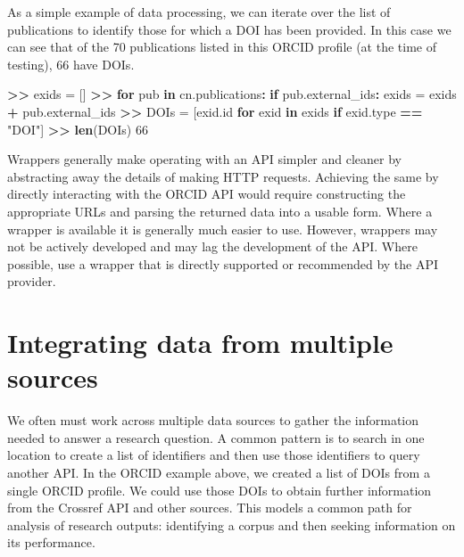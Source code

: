 \documentclass[]{krantz}
\newenvironment{Shaded}{\begin{snugshade}}{\end{snugshade}}
\newcommand{\KeywordTok}[1]{\textcolor[rgb]{0.13,0.29,0.53}{\textbf{#1}}}
\newcommand{\DecValTok}[1]{\textcolor[rgb]{0.00,0.00,0.81}{#1}}
\newcommand{\StringTok}[1]{\textcolor[rgb]{0.31,0.60,0.02}{#1}}
\newcommand{\ControlFlowTok}[1]{\textcolor[rgb]{0.13,0.29,0.53}{\textbf{#1}}}
\newcommand{\OperatorTok}[1]{\textcolor[rgb]{0.81,0.36,0.00}{\textbf{#1}}}
\newcommand{\ErrorTok}[1]{\textcolor[rgb]{0.64,0.00,0.00}{\textbf{#1}}}
\newcommand{\NormalTok}[1]{#1}
\begin{document}
As a simple example of data processing, we can iterate over the list of
publications to identify those for which a DOI has been provided. In
this case we can see that of the 70 publications listed in this ORCID
profile (at the time of testing), 66 have DOIs.

\begin{Shaded}
\begin{Highlighting}[]
\OperatorTok{>}\ErrorTok{>}\StringTok{ }\NormalTok{exids =}\StringTok{ }\NormalTok{[]}
\OperatorTok{>}\ErrorTok{>}\StringTok{ }\ControlFlowTok{for}\NormalTok{ pub }\ControlFlowTok{in}\NormalTok{ cn.publications}\OperatorTok{:}
\StringTok{        }\ControlFlowTok{if}\NormalTok{ pub.external_ids}\OperatorTok{:}
\StringTok{        }\NormalTok{exids =}\StringTok{ }\NormalTok{exids }\OperatorTok{+}\StringTok{ }\NormalTok{pub.external_ids}
\OperatorTok{>}\ErrorTok{>}\StringTok{ }\NormalTok{DOIs =}\StringTok{ }\NormalTok{[exid.id }\ControlFlowTok{for}\NormalTok{ exid }\ControlFlowTok{in}\NormalTok{ exids }\ControlFlowTok{if}\NormalTok{ exid.type }\OperatorTok{==}\StringTok{ "DOI"}\NormalTok{]}
\OperatorTok{>}\ErrorTok{>}\StringTok{ }\KeywordTok{len}\NormalTok{(DOIs)}
\DecValTok{66}
\end{Highlighting}
\end{Shaded}

Wrappers generally make operating with an API simpler and cleaner by
abstracting away the details of making HTTP requests. Achieving the same
by directly interacting with the ORCID API would require constructing
the appropriate URLs and parsing the returned data into a usable form.
Where a wrapper is available it is generally much easier to use.
However, wrappers may not be actively developed and may lag the
development of the API. Where possible, use a wrapper that is directly
supported or recommended by the API provider.

\section{Integrating data from multiple sources}\label{sec:4-6}

We often must work across multiple data sources to gather the
information needed to answer a research question. A common pattern is to
search in one location to create a list of identifiers and then use
those identifiers to query another API. In the ORCID example above, we
created a list of DOIs from a single ORCID profile. We could use those
DOIs to obtain further information from the Crossref API and other
sources. This models a common path for analysis of research outputs:
identifying a corpus and then seeking information on its performance.
\end{document}
